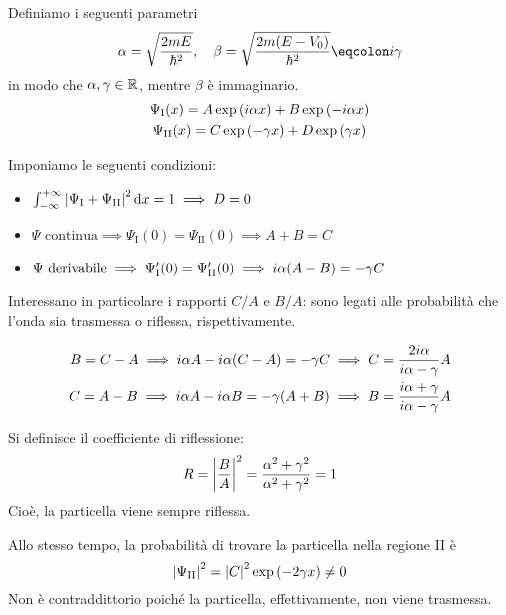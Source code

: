 Definiamo i seguenti parametri
\begin{equation}
    \alpha = \sqrt{\frac{2 m E}{\hbar^2}}, \quad
    \beta = \sqrt{\frac{2 m (E - V_0)}{\hbar^2}} \eqcolon \im \gamma
\end{equation}
in modo che $\alpha, \gamma \in \mathbb{R}$, mentre $\beta$ è immaginario.
\begin{subequations}
\begin{gather}
    \Psi_\mathrm{I}(x) = A \operatorname{exp}\left( i \alpha x \right) + B \operatorname{exp}\left( -i \alpha x \right) \\
    \Psi_\mathrm{II}(x) = C \operatorname{exp}\left( -\gamma x \right) + D \operatorname{exp}\left( \gamma x \right)
\end{gather}
\end{subequations}

Imponiamo le seguenti condizioni:
\begin{itemize}
    \item $\int_{-\infty}^{+\infty} \left\lvert \Psi_\mathrm{I} + \Psi_\mathrm{II} \right\rvert^2 \mathrm{d} x = 1 \implies D = 0$
    \item $\Psi \text{ continua} \implies \Psi_\mathrm{I}(0) = \Psi_\mathrm{II}(0) \implies A + B = C$
    \item $\Psi \text{ derivabile} \implies \Psi_\mathrm{I}'(0) = \Psi_\mathrm{II}'(0) \implies i \alpha (A - B) = - \gamma C$
\end{itemize}

Interessano in particolare i rapporti $C/A$ e $B/A$: sono legati alle probabilità che l'onda sia trasmessa o riflessa, rispettivamente.

\begin{subequations}
\begin{align}
    B = C - A
    \implies i \alpha A - i \alpha (C - A) = - \gamma C
    \implies C = \frac{2 i \alpha}{i \alpha - \gamma} A \\
    C = A - B
    \implies i \alpha A - i \alpha B = - \gamma (A + B)
    \implies B = \frac{i \alpha + \gamma}{i \alpha - \gamma} A
\end{align}
\end{subequations}

Si definisce il coefficiente di riflessione:
\begin{equation}
    R = \left\lvert \frac{B}{A} \right\rvert^2 = \frac{\alpha^2 + \gamma^2}{\alpha^2 + \gamma^2} = 1
\end{equation}
Cioè, la particella viene sempre riflessa.

Allo stesso tempo, la probabilità di trovare la particella nella regione II è
\begin{equation}
    \left\lvert \Psi_\mathrm{II} \right\rvert^2 = \left\lvert C \right\rvert^2 \operatorname{exp}\left( -2 \gamma x \right) \ne 0
\end{equation}
Non è contraddittorio poiché la particella, effettivamente, non viene trasmessa.

